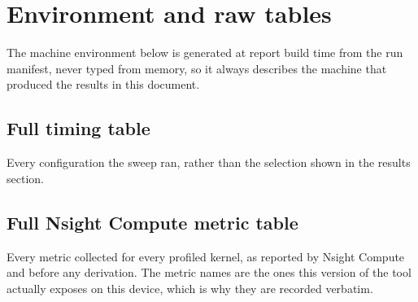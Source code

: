 \section{Environment and raw tables}

The machine environment below is generated at report build time from the run
manifest, never typed from memory, so it always describes the machine that
produced the results in this document.


\subsection{Full timing table}

Every configuration the sweep ran, rather than the selection shown in the
results section.


\subsection{Full Nsight Compute metric table}

Every metric collected for every profiled kernel, as reported by Nsight Compute
and before any derivation. The metric names are the ones this version of the
tool actually exposes on this device, which is why they are recorded verbatim.

